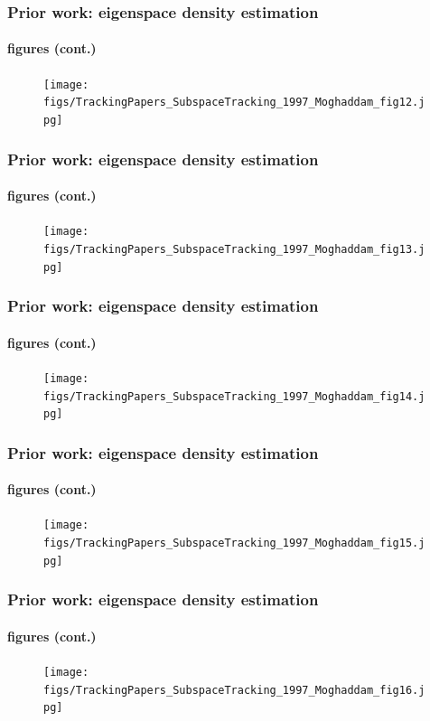 \begin{frame}
\frametitle{Prior work: eigenspace density estimation}
\framesubtitle{figures (cont.)}
\mypagenum
	\begin{figure}
		\texttt{[image: figs/TrackingPapers\_SubspaceTracking\_1997\_Moghaddam\_fig12.jpg]}
	\end{figure}
\end{frame}



\begin{frame}
\frametitle{Prior work: eigenspace density estimation}
\framesubtitle{figures (cont.)}
\mypagenum
	\begin{figure}
		\texttt{[image: figs/TrackingPapers\_SubspaceTracking\_1997\_Moghaddam\_fig13.jpg]}
	\end{figure}
\end{frame}



\begin{frame}
\frametitle{Prior work: eigenspace density estimation}
\framesubtitle{figures (cont.)}
\mypagenum
	\begin{figure}
		\texttt{[image: figs/TrackingPapers\_SubspaceTracking\_1997\_Moghaddam\_fig14.jpg]}
	\end{figure}
\end{frame}



\begin{frame}
\frametitle{Prior work: eigenspace density estimation}
\framesubtitle{figures (cont.)}
\mypagenum
	\begin{figure}
		\texttt{[image: figs/TrackingPapers\_SubspaceTracking\_1997\_Moghaddam\_fig15.jpg]}
	\end{figure}
\end{frame}



\begin{frame}
\frametitle{Prior work: eigenspace density estimation}
\framesubtitle{figures (cont.)}
\mypagenum
	\begin{figure}
		\texttt{[image: figs/TrackingPapers\_SubspaceTracking\_1997\_Moghaddam\_fig16.jpg]}
	\end{figure}
\end{frame}



